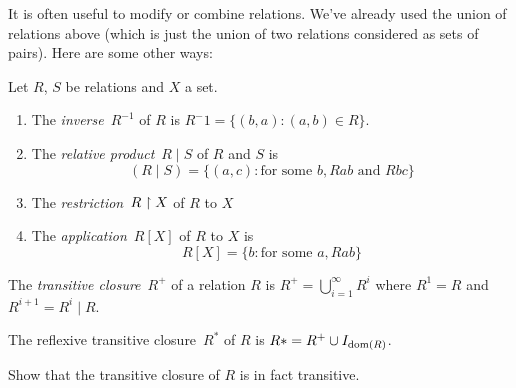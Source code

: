 \documentclass[open-logic-section]{subfiles}
\begin{document}

It is often useful to modify or combine relations. We've already used
the union of relations above (which is just the union of two relations
considered as sets of pairs). Here are some other ways:

\begin{defn} Let $R$, $S$ be relations and $X$ a set.
\begin{enumerate}
\item The \emph{inverse}~$R^{-1}$ of $R$ is $R^-1 = \{ (b, a) : (a, b)
  \in R\}$.
\item The \emph{relative product}~$R \mid S$ of $R$ and $S$ is 
\[
(R \mid S) = \{(a, c) : \text{for some }b, Rab \text{ and } Rbc\}
\]
\item The \emph{restriction}~$R \upharpoonright X$ of $R$ to $X$
\item The \emph{application}~$R[X]$ of $R$ to $X$ is
\[
R[X] = \{b : \text{for some }a, Rab\}
\]
\end{enumerate}
\end{defn}

\begin{defn}
The \emph{transitive closure}~$R^+$ of a relation $R$ is $R^+ =
\bigcup_{i=1}^\infty R^i$ where $R^1 = R$ and $R^{i+1} = R^i \mid R$.

The reflexive transitive closure~$R^*$ of $R$ is $R* = R^+ \cup
I_{\mathrm{dom}(R)}$.
\end{defn}

\begin{prob}
Show that the transitive closure of $R$ is in fact transitive.
\end{prob}
\end{document}
